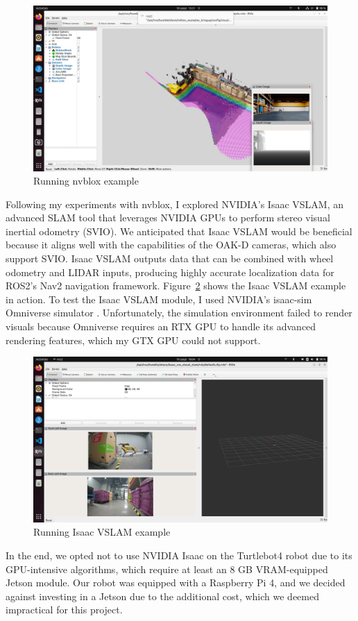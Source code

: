 \begin{figure}[htbp]
	\centering
	\includegraphics[width=150mm, keepaspectratio]{figures_jpg/nvblox.jpg}
	\caption{Running nvblox example}
	\label{fig:nvblox_example}
\end{figure}

Following my experiments with nvblox, I explored NVIDIA's Isaac VSLAM, an advanced SLAM tool that leverages NVIDIA GPUs to perform stereo visual inertial odometry (SVIO). We anticipated that Isaac VSLAM would be beneficial because it aligns well with the capabilities of the OAK-D cameras, which also support SVIO. Isaac VSLAM outputs data that can be combined with wheel odometry and LIDAR inputs, producing highly accurate localization data for ROS2's Nav2 navigation framework. Figure~\ref{fig:isaac_vslam_example} shows the Isaac VSLAM example in action. To test the Isaac VSLAM module, I used NVIDIA's isaac-sim Omniverse simulator \cite{isaac_sim_docs}. Unfortunately, the simulation environment failed to render visuals because Omniverse requires an RTX GPU to handle its advanced rendering features, which my GTX GPU could not support.

\begin{figure}[htbp]
	\centering
	\includegraphics[width=150mm, keepaspectratio]{figures_jpg/isaac_vslam_example.jpg}
	\caption{Running Isaac VSLAM example}
	\label{fig:isaac_vslam_example}
\end{figure}

In the end, we opted not to use NVIDIA Isaac on the Turtlebot4 robot due to its GPU-intensive algorithms, which require at least an 8 GB VRAM-equipped Jetson module. Our robot was equipped with a Raspberry Pi 4, and we decided against investing in a Jetson due to the additional cost, which we deemed impractical for this project.
